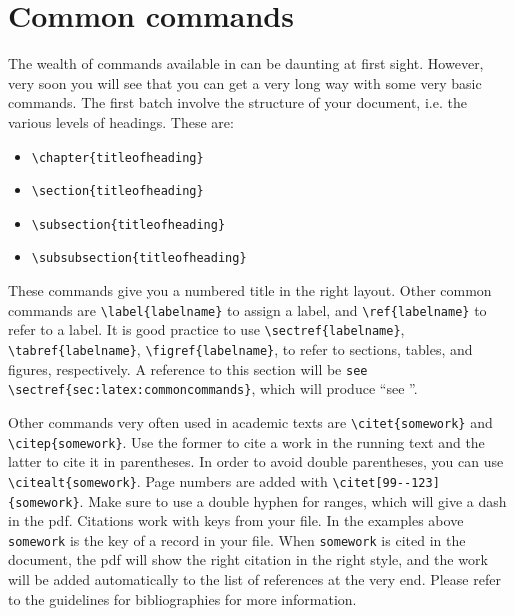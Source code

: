 \section{Common commands}\label{sec:latex:commoncommands}
The wealth of commands available in \latex can be daunting at first sight. However, very soon you will see that you can get a very long way with some very basic commands. The first batch involve the structure of your document, i.e. the various levels of headings. These are:
\begin{itemize}
\item \verb+\chapter{titleofheading}+
\item \verb+\section{titleofheading}+
\item \verb+\subsection{titleofheading}+
\item \verb+\subsubsection{titleofheading}+
\end{itemize}

These commands give you a numbered title in the right layout.
Other common commands are 
\verb+\label{labelname}+ 
to assign a label, and 
\verb+\ref{labelname}+
to refer to a label. It is good practice to use 
\verb+\sectref{labelname}+,
\verb+\tabref{labelname}+,
\verb+\figref{labelname}+,
to refer to sections, tables, and figures, respectively. A reference to this section will be \verb+see \sectref{sec:latex:commoncommands}+, which will produce ``see ''.

Other commands very often used in academic texts are \verb+\citet{somework}+ and \verb+\citep{somework}+. Use the former to cite a work in the running text and the latter to cite it in parentheses. In order to avoid double parentheses, you can use  \verb+\citealt{somework}+. Page numbers are added with \verb+\citet[99--123]{somework}+. Make sure to use a double hyphen for ranges, which will give a dash in the pdf. Citations work with keys from your \bibtex file. In the examples above \verb+somework+ is the key of a record in your \bibtex file. When \verb+somework+ is cited in the document, the pdf will show the right citation in the right style, and the work will be added automatically to the list of references at the very end. Please refer to the guidelines for bibliographies for more information.


